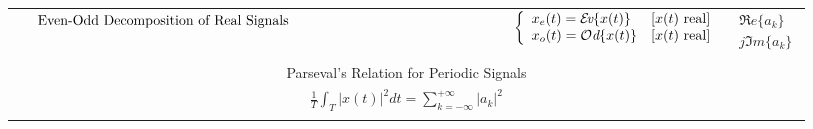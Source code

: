 \documentclass[12pt]{article}
\numberwithin{equation}{section}
\newcommand{\Ev}{\mbox{$\cal E\!$\it v}}
\newcommand{\Od}{\mbox{$\cal O$\it d}}
\begin{document}
\begin{table}[tbp]
\begin{center}
\begin{tabular}{p{1.40in}ll}
{\small $\vcenter{Even-Odd Decomposition of Real Signals}$}
  & $\displaystyle \left\{
    \begin{array}{ll}
      x_{e}(t)=\Ev \{x(t)\} & [x(t)\ {\rm real}] \\
      x_{o}(t)=\Od \{x(t)\} & [x(t)\ {\rm real}]
    \end{array} \right.$
  & $\displaystyle
    \begin{array}{l}
      \Re e\{a_{k}\} \\
      j\Im m\{a_{k}\}
    \end{array}$
  \\
\multicolumn{3}{l}{ } \\
\multicolumn{3}{c}{Parseval's Relation for Periodic Signals} \\
\multicolumn{3}{c}{$\displaystyle \frac{1}{T} \int_{T}|x(t)|^{2}
dt =
\sum^{+\infty}_{k=-\infty} |a_{k}|^{2}$} \\
& & \\ \hline
\end{tabular}
\end{center}
\end{table}
\clearpage

%
%
\end{document}
